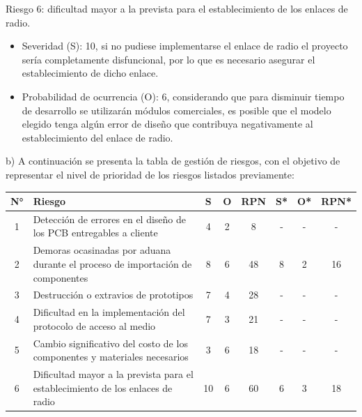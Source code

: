 \documentclass[
11pt, %
codirector, %
]{charter}
\begin{document}
Riesgo 6: dificultad mayor a la prevista para el establecimiento de los enlaces de radio.
\begin{itemize}
	\item Severidad (S): 10, si no pudiese implementarse el enlace de radio el proyecto sería completamente disfuncional, por lo que es necesario asegurar el establecimiento de dicho enlace.
	\item Probabilidad de ocurrencia (O): 6, considerando que para disminuir tiempo de desarrollo se utilizarán módulos comerciales, es posible que el modelo elegido tenga algún error de diseño que contribuya negativamente al establecimiento del enlace de radio.
\end{itemize}


b) A continuación se presenta la tabla de gestión de riesgos, con el objetivo de representar el nivel de prioridad de los riesgos listados previamente:

\begin{table}[htpb]
\centering
\begin{tabularx}{\linewidth}{@{}|c|X|c|c|c|c|c|c|@{}}
\hline
\rowcolor[HTML]{C0C0C0} 
N° & Riesgo & S & O & RPN & S* & O* & RPN* \\ \hline
1  & Detección de errores en el diseño de los PCB entregables a cliente
& 4   & 2   & 8     & -    & -    & -      \\ \hline

2  & Demoras ocasinadas por aduana durante el proceso de importación de componentes
& 8   & 6   & 48     & 8    & 2    & 16      \\ \hline

3  & Destrucción o extravios de prototipos
& 7   & 4   & 28     & -    & -    & -      \\ \hline

4  & Dificultad en la implementación del protocolo de acceso al medio
& 7   & 3   & 21     & -   & -   & -     \\ \hline

5  & Cambio significativo del costo de los componentes y materiales necesarios
& 3   & 6   & 18     & -    & -    & -      \\ \hline

6  & Dificultad mayor a la prevista para el establecimiento de los enlaces de radio
& 10   & 6   & 60     & 6    & 3    & 18      \\ \hline
\end{tabularx}%
\end{table}
\end{document}
